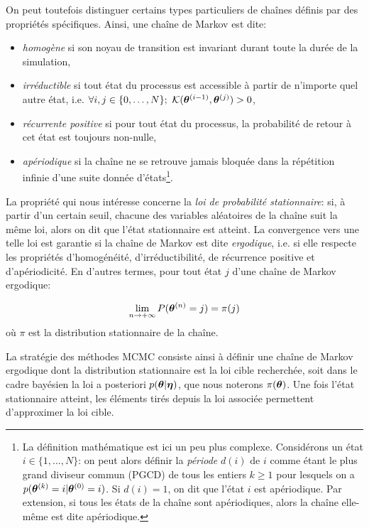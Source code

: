 On peut toutefois distinguer certains types particuliers de chaînes définis par des propriétés spécifiques. Ainsi, une chaîne de Markov est dite:
\begin{itemize}
	\item \textit{homogène} si son noyau de transition est invariant durant toute la durée de la simulation,
	\item \textit{irréductible} si tout état du processus est accessible à partir de n'importe quel autre état, i.e. $\forall i,j \in \{0,\dots,N\}; ~ {\mathcal{K}}({{\bm{\theta}}^{(i-1)}}, {\bm{\theta}}^{(j)}) > 0$,
	\item \textit{récurrente positive} si pour tout état du processus, la probabilité de retour à cet état est toujours non-nulle,
	\item \textit{apériodique} si la chaîne ne se retrouve jamais bloquée dans la répétition infinie d'une suite donnée d'états\footnote{La définition mathématique est ici un peu plus complexe. Considérons un état $i \in \{1, \dots, N\}$: on peut alors définir la \textit{période} $d(i)$ de $i$ comme étant le plus grand diviseur commun (PGCD) de tous les entiers $k \geq 1$ pour lesquels on a $p({\bm{\theta}}^{(k)} = i | {\bm{\theta}}^{(0)} = i)$. Si $d(i) = 1$, on dit que l'état $i$ est apériodique. Par extension, si tous les états de la chaîne sont apériodiques, alors la chaîne elle-même est dite apériodique.}.\\
\end{itemize}

La propriété qui nous intéresse concerne la \textit{loi de probabilité stationnaire}: si, à partir d'un certain seuil, chacune des variables aléatoires de la chaîne suit la même loi, alors on dit que l'état stationnaire est atteint. La convergence vers une telle loi est garantie si la chaîne de Markov est dite \textit{ergodique}, i.e. si elle respecte les propriétés d'homogénéité, d'irréductibilité, de récurrence positive et d'apériodicité. En d'autres termes, pour tout état $j$ d'une chaîne de Markov ergodique:

\begin{equation}
\lim_{n \rightarrow + \infty} P({\bm{\theta}}^{(n)} = j) = \pi(j)
\label{eq_definition_loi_stationnaire}
\end{equation}
où $\pi$ est la distribution stationnaire de la chaîne. 


La stratégie des méthodes MCMC consiste ainsi à définir une chaîne de Markov ergodique dont la distribution stationnaire est la loi cible recherchée, soit dans le cadre bayésien la loi a posteriori ${p({\bm{\theta}} | {\bm{\eta}})}$, que nous noterons $\pi({\bm{\theta}})$. Une fois l'état stationnaire atteint, les éléments tirés depuis la loi associée permettent d'approximer  la loi cible.


